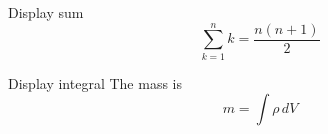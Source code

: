 \documentclass{beamer}
\begin{document}
\begin{frame}{Display sum}
\[ \sum_{k=1}^{n} k = \frac{n(n+1)}{2} \]
\end{frame}

\begin{frame}{Display integral}
The mass is
\[ m = \int \rho \, dV \]
\end{frame}
\end{document}
